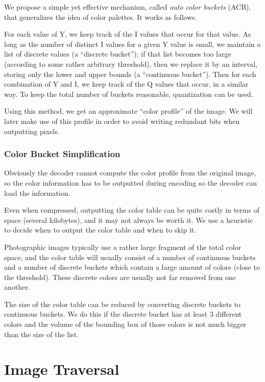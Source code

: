 \documentclass[a4paper,USenglish]{lipics}
\begin{document}
We propose a simple yet effective mechanism, called {\it auto color buckets} (ACB),
that generalizes the idea of color palettes. It works as follows.

For each value of Y, we keep track of the I values that occur for that value. As long as the number of
distinct I values for a given Y value is small, we maintain a list of discrete values (a ``discrete bucket'');
if that list becomes too large (according to some rather arbitrary threshold),
then we replace it by an interval, storing only the lower and upper bounds (a ``continuous bucket'').
Then for each combination of Y and I, we keep track of the Q values that occur, in a similar way.
To keep the total number of buckets reasonable, quantization can be used.


Using this method, we get an approximate ``color profile'' of the image.
We will later make use of this profile in order to avoid writing redundant bits when outputting pixels.


\subsubsection{Color Bucket Simplification}

Obviously the decoder cannot compute the color profile from the original image, so the
color information has to be outputted during encoding so the decoder can load the information.


Even when compressed, outputting the color table can be quite costly in terms of space (several kilobytes),
and it may not always be worth it. We use a heuristic to decide when to output the color table
and when to skip it.

Photographic images typically use a rather large fragment of the total color space,
and the color table will usually consist of a number of continuous buckets and a number
of discrete buckets which contain a large amount of colors (close to the threshold).
These discrete colors are usually not far removed from one another.

The size of the color table can be reduced by converting discrete buckets to continuous
buckets. We do this if the discrete bucket has at least 3 different colors and the volume of the
bounding box of those colors is not much bigger than the size of the list.



\section{Image Traversal}
\label{sec:traversal}
\end{document}
